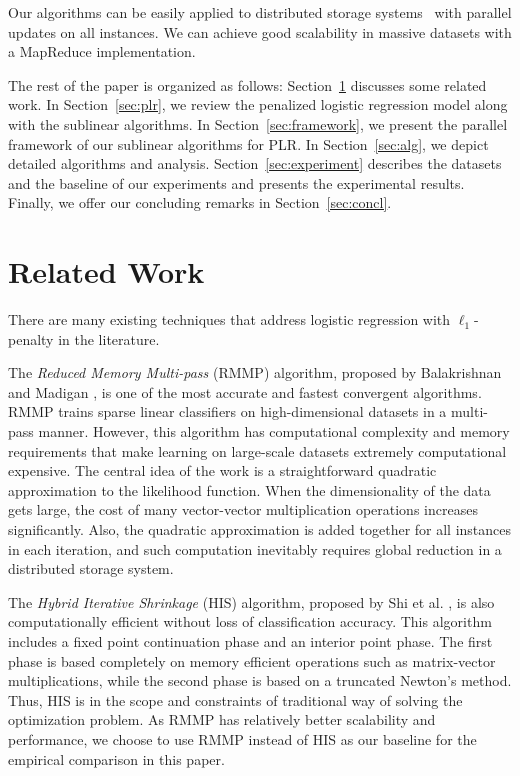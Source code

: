 \documentclass{llncs}
\begin{document}
Our algorithms can be easily applied to distributed storage systems~\cite{hogan1990livermore} with parallel updates on all instances.
We can achieve good scalability in massive datasets with a MapReduce implementation.
	
The rest of the paper is organized as follows:
Section~\ref{sec:rew} discusses some related work.
In Section~\ref{sec:plr}, we review the penalized logistic regression model along with the sublinear algorithms.
In Section~\ref{sec:framework}, we present the parallel framework of our sublinear algorithms for PLR.
In Section~\ref{sec:alg}, we depict detailed algorithms and analysis.
Section~\ref{sec:experiment} describes the datasets and the baseline of our experiments and presents the experimental results.
Finally, we offer our concluding remarks in Section~\ref{sec:concl}.

\section{Related Work} \label{sec:rew}
There are many existing techniques that address logistic regression with $\ell_1$-penalty in the literature.

The \textit{Reduced Memory Multi-pass} (RMMP) algorithm, proposed by Balakrishnan and Madigan \cite{balakrishnan2008algorithms}, is one of the most accurate and fastest convergent algorithms.
RMMP trains sparse linear classifiers on high-dimensional datasets in a multi-pass manner.
However, this algorithm has computational complexity and memory requirements that make learning on large-scale datasets extremely computational expensive.
The central idea of the work is a straightforward quadratic approximation to the likelihood function.
When the dimensionality of the data gets large, the cost of many vector-vector multiplication operations increases significantly.
Also, the quadratic approximation is added together for all instances in each iteration, and such computation inevitably requires global reduction in a distributed storage system.

The \textit{Hybrid Iterative Shrinkage} (HIS) algorithm, proposed by Shi et al. \cite{shi2008fast}, is also computationally efficient without loss of classification accuracy.
This algorithm includes a fixed point continuation phase and an interior point phase.
The first phase is based completely on memory efficient operations such as matrix-vector multiplications, while the second phase is based on a truncated Newton's method.
Thus, HIS is in the scope and constraints of traditional way of solving the optimization problem.
As RMMP has relatively better scalability and performance, we choose to use RMMP instead of HIS as our baseline for the empirical comparison in this paper.
\end{document}
